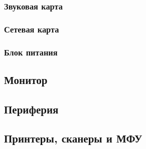 \subsubsection{Звуковая карта}\label{base:introduction:components:soundcard}


\subsubsection{Сетевая карта}\label{base:introduction:components:nic}


\subsubsection{Блок питания}\label{base:introduction:components:psu}


\subsection{Монитор}\label{base:introduction:components:monitor}


\subsection{Периферия}\label{base:introduction:components:peripheral}


\subsection{Принтеры, сканеры и МФУ}\label{base:introduction:components:printers}


